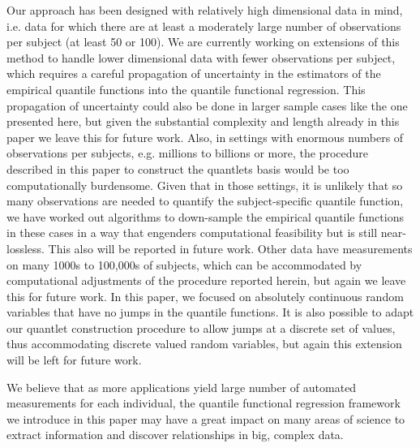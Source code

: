 \documentclass[11pt]{article}
\begin{document}
Our approach has been designed with relatively high dimensional data in mind, i.e. data for which there are at least 
a moderately large number of observations per subject (at least 50 or 100). 
  We are currently working on extensions of this method to handle lower dimensional data with fewer observations per subject, which requires a careful propagation of uncertainty in the estimators of the empirical quantile functions into the quantile functional regression.  This propagation of uncertainty could also be done in larger sample cases like the one presented here, but given the substantial complexity and length already in this paper we leave this for future work.  
Also, in settings with enormous numbers of observations per subjects, e.g. millions to billions or more, the procedure described in this paper to construct the quantlets basis would be too computationally burdensome.  Given that in those settings, it is unlikely that so many observations are needed to quantify the subject-specific quantile function, we have worked out algorithms to down-sample the empirical quantile functions in these cases in a way that engenders computational feasibility but is still near-lossless.  This also will be reported in future work.   Other data have measurements on many 1000s to 100,000s of subjects, which can be accommodated by computational adjustments of the procedure reported herein, but again we leave this for future work.   In this paper, we focused on absolutely continuous random variables that have no jumps in the quantile functions.  It is also possible to adapt our quantlet construction procedure to allow jumps at a discrete set of values, thus accommodating discrete valued random variables, but again this extension will be left for future work.


We believe that as more applications yield large number of automated measurements for each individual, the quantile functional regression framework we introduce in this paper may have a great impact on many areas of science to extract information and discover relationships in big, complex data.






\baselineskip 12pt


\end{document}
